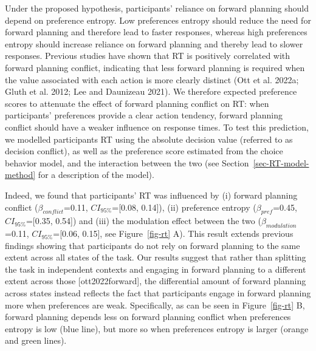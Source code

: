 \documentclass[
  letterpaper,
  DIV=11,
  numbers=noendperiod]{scrartcl}
\begin{document}
Under the proposed hypothesis, participants' reliance on forward
planning should depend on preference entropy. Low preferences entropy
should reduce the need for forward planning and therefore lead to faster
responses, whereas high preferences entropy should increase reliance on
forward planning and thereby lead to slower responses. Previous studies
have shown that RT is positively correlated with forward planning
conflict, indicating that less forward planning is required when the
value associated with each action is more clearly distinct (Ott et al.
2022a; Gluth et al. 2012; Lee and Daunizeau 2021). We therefore expected
preference scores to attenuate the effect of forward planning conflict
on RT: when participants' preferences provide a clear action tendency,
forward planning conflict should have a weaker influence on response
times. To test this prediction, we modelled participants RT using the
absolute decision value (referred to as decision conflict), as well as
the preference score estimated from the choice behavior model, and the
interaction between the two (see Section~\ref{sec-RT-model-method} for a
description of the model).

Indeed, we found that participants' RT was influenced by (i) forward
planning conflict (\(\beta_{conflict}\)=0.11, \(CI_{95\%}\)={[}0.08,
0.14{]}), (ii) preference entropy (\(\beta_{pref}\)=0.45,
\(CI_{95\%}\)={[}0.35, 0.54{]}) and (iii) the modulation effect between
the two (\(\beta_{modulation}\)=0.11, \(CI_{95\%}\)={[}0.06, 0.15{]},
see Figure~\ref{fig-rt} A). This result extends previous findings
showing that participants do not rely on forward planning to the same
extent across all states of the task. Our results suggest that rather
than splitting the task in independent contexts and engaging in forward
planning to a different extent across those {[}ott2022forward{]}, the
differential amount of forward planning across states instead reflects
the fact that participants engage in forward planning more when
preferences are weak. Specifically, as can be seen in
Figure~\ref{fig-rt} B, forward planning depends less on forward planning
conflict when preferences entropy is low (blue line), but more so when
preferences entropy is larger (orange and green lines).
\end{document}
